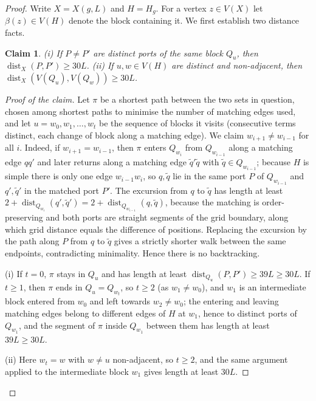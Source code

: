 \documentclass[11pt,a4paper]{article}
\theoremstyle{plain}
\newtheorem{claim}[theorem]{Claim}
\theoremstyle{definition}
\theoremstyle{remark}
\newcommand{\dist}{\operatorname{dist}}
\begin{document}
\label{pf:shallow}
\lemshallow*
\begin{proof}
Write $X=X(g,L)$ and $H=H_g$. For a vertex $z\in V(X)$ let $\beta(z)\in V(H)$ denote the block containing it. We first establish two distance facts.

\begin{claim}\label{cl:ports}
(i) If $P\neq P'$ are distinct ports of the same block $Q_u$, then $\dist_X(P,P')\ge30L$. (ii) If $u,w\in V(H)$ are distinct and non-adjacent, then $\dist_X(V(Q_u),V(Q_w))\ge30L$.
\end{claim}
\begin{proof}[Proof of the claim]
Let $\pi$ be a shortest path between the two sets in question, chosen among shortest paths to minimise the number of matching edges used, and let $u=w_0,w_1,\dots,w_t$ be the sequence of blocks it visits (consecutive terms distinct, each change of block along a matching edge). We claim $w_{i+1}\ne w_{i-1}$ for all $i$. Indeed, if $w_{i+1}=w_{i-1}$, then $\pi$ enters $Q_{w_i}$ from $Q_{w_{i-1}}$ along a matching edge $qq'$ and later returns along a matching edge $\tilde q'\tilde q$ with $\tilde q\in Q_{w_{i-1}}$; because $H$ is simple there is only one edge $w_{i-1}w_i$, so $q,\tilde q$ lie in the same port $P$ of $Q_{w_{i-1}}$ and $q',\tilde q'$ in the matched port $P'$. The excursion from $q$ to $\tilde q$ has length at least $2+\dist_{Q_{w_i}}(q',\tilde q')=2+\dist_{Q_{w_{i-1}}}(q,\tilde q)$, because the matching is order-preserving and both ports are straight segments of the grid boundary, along which grid distance equals the difference of positions. Replacing the excursion by the path along $P$ from $q$ to $\tilde q$ gives a strictly shorter walk between the same endpoints, contradicting minimality. Hence there is no backtracking.

(i) If $t=0$, $\pi$ stays in $Q_u$ and has length at least $\dist_{Q_u}(P,P')\ge39L\ge30L$. If $t\ge1$, then $\pi$ ends in $Q_u=Q_{w_t}$, so $t\ge2$ (as $w_1\ne w_0$), and $w_1$ is an intermediate block entered from $w_0$ and left towards $w_2\ne w_0$; the entering and leaving matching edges belong to different edges of $H$ at $w_1$, hence to distinct ports of $Q_{w_1}$, and the segment of $\pi$ inside $Q_{w_1}$ between them has length at least $39L\ge30L$.

(ii) Here $w_t=w$ with $w\ne u$ non-adjacent, so $t\ge2$, and the same argument applied to the intermediate block $w_1$ gives length at least $30L$.
\end{proof}


\end{proof}
\end{document}
